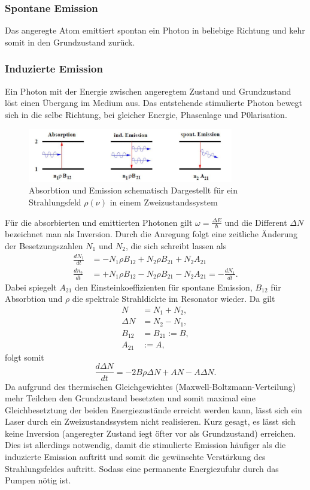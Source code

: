 \subsubsection*{Spontane Emission}
Das angeregte Atom emittiert spontan ein Photon in beliebige Richtung und kehr somit in den Grundzustand zurück.
\subsubsection*{Induzierte Emission}
Ein Photon mit der Energie zwischen angeregtem Zustand und Grundzustand löst einen Übergang im Medium aus. Das entstehende stimulierte Photon
bewegt sich in die selbe Richtung, bei gleicher Energie, Phasenlage und P0larisation.

\begin{figure}
    \center
    \includegraphics[width=0.8\textwidth]{bilder/3wege.jpg}
    \caption{Absorbtion und Emission schematisch Dargestellt für ein Strahlungsfeld $\rho(\nu)$ in einem Zweizustandssystem \cite{anleitung}}
    \label{fig:3wege}
\end{figure}
\label{sec:theorie}

Für die absorbierten und emittierten Photonen gilt $\omega=\frac{\Delta E}{\hbar}$ und die Different $\Delta N$ bezeichnet man als Inversion.
Durch die Anregung folgt eine zeitliche Änderung der Besetzungszahlen $N_1$ und $N_2$, die sich schreibt lassen als
\begin{align}
    \frac{dN_1}{dt}&=-N_1\rho B_{12}+N_2\rho B_{21} + N_2 A_{21}\\
    \frac{dn_2}{dt}&=+N_1\rho B_{12}-N_2\rho B_{21} - N_2 A_{21}= -\frac{dN_1}{dt}.
\end{align}
Dabei spiegelt $A_{21}$ den Einsteinkoeffizienten für spontane Emission, $B_{12}$ für Absorbtion und $\rho$ die spektrale Strahldickte im Resonator wieder.
Da gilt
\begin{align}
    N&=N_1+N_2{,}\\
    \Delta N &= N_2-N_1{,}\\
    B_{12}&=B_{21}:=B{,}\\
    A_{21}&:=A{,}   
\end{align}
folgt somit
\begin{equation}
    \frac{d\Delta N}{dt}=-2B\rho\Delta N + AN-A\Delta N.
\end{equation}
Da aufgrund des thermischen Gleichgewichtes (Maxwell-Boltzmann-Verteilung) mehr Teilchen den Grundzustand besetzten und somit maximal eine 
Gleichbesetztung der beiden Energiezustände erreicht werden kann, lässt sich ein Laser durch ein Zweizustandssystem nicht realisieren. Kurz gesagt,
es lässt sich keine Inversion (angeregter Zustand iegt öfter vor als Grundzustand) erreichen.
Dies ist allerdings notwendig, damit die stimulierte Emission häufiger als die induzierte Emission auftritt und somit die gewünschte Verstärkung des Strahlungsfeldes auftritt.
Sodass eine permanente Energiezufuhr durch das Pumpen nötig ist.


